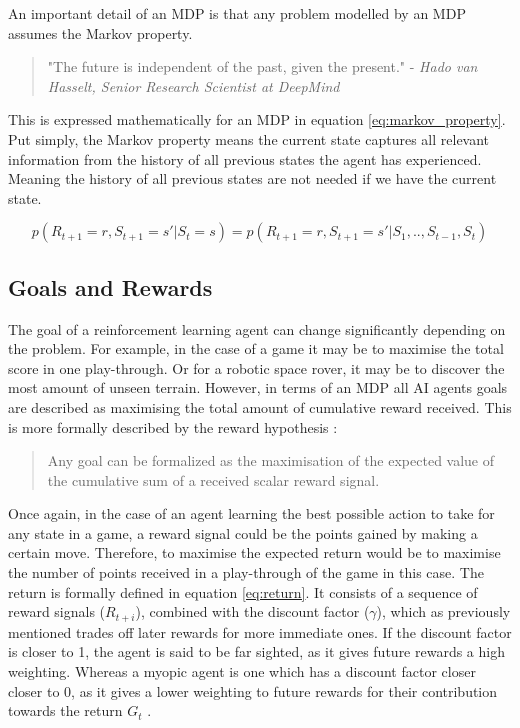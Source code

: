 \documentclass[../dissertation.tex]{subfiles}
\begin{document}
\noindent
An important detail of an MDP  is that any problem modelled by an MDP assumes the Markov property.

\begin{quote}
"The future is independent of the past, given the present." - \textit{Hado van Hasselt, Senior Research Scientist at DeepMind} \cite{introToRL}
\end{quote}

\noindent
This is expressed mathematically for an MDP in equation \ref{eq:markov_property}. Put simply, the Markov property means the current state captures all relevant information from the history of all previous states the agent has experienced. Meaning the history of all previous states are not needed if we have the current state.

\begin{equation}
\label{eq:markov_property}
p(R_{t+1} = r, S_{t+1} = s' | S_t = s) = p(R_{t+1} = r, S_{t+1} = s' | S_1, .. , S_{t-1}, S_{t})
\end{equation}

\subsection{Goals and Rewards}
The goal of a reinforcement learning agent can change significantly depending on the problem. For example, in the case of a game it may be to maximise the total score in one play-through. Or for a robotic space rover, it may be to discover the most amount of unseen terrain. However, in terms of an MDP all AI agents goals are described as maximising the total amount of cumulative reward received. This is more formally described by the reward hypothesis \cite{sutton2011reinforcement}:

\begin{quote}
Any goal can be formalized as the maximisation of the expected value of the cumulative sum of a received scalar reward signal.
\end{quote}

Once again, in the case of an agent learning the best possible action to take for any state in a game, a reward signal could be the points gained by making a certain move. Therefore, to maximise the expected return would be to maximise the number of points received in a play-through of the game in this case.  The return is formally defined in equation \ref{eq:return}. It consists of a sequence of reward signals ($R_{t+i}$), combined with the discount factor ($\gamma$), which as previously mentioned trades off later rewards for more immediate ones. If the discount factor is closer to 1, the agent is said to be far sighted, as it gives future rewards a high weighting. Whereas a myopic agent is one which has a discount factor closer closer to 0, as it gives a lower weighting to future rewards for their contribution towards the return $G_t$ \cite{introToRL}. 
\end{document}
